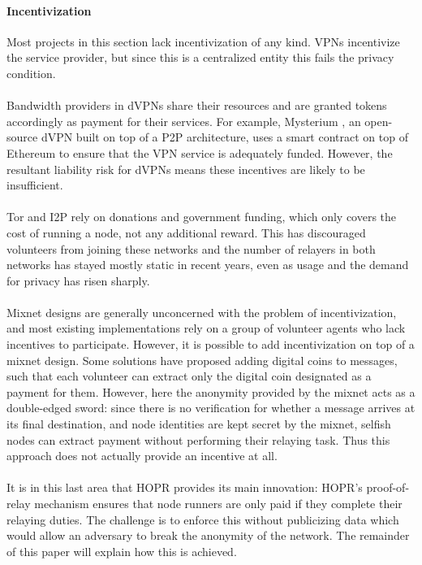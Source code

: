 \paragraph{Incentivization} Most projects in this section lack incentivization of any kind. VPNs incentivize the service provider, but since this is a centralized entity this fails the privacy condition. 
\\~\\Bandwidth providers in dVPNs share their resources and are granted tokens accordingly as payment for their
services. For example, Mysterium \cite{mysterium}, an open-source dVPN built on top of a P2P architecture, uses a smart contract on top of Ethereum to ensure
that the VPN service is adequately funded. However, the resultant liability risk for dVPNs means these incentives are likely to be insufficient. 
\\~\\Tor and I2P rely on donations and government funding, which only covers the cost of running a node, not any additional reward. This has discouraged volunteers from joining these networks and the number of relayers in both networks has stayed mostly static in recent years, even as usage and the demand for privacy has risen sharply.
\\~\\Mixnet designs are generally unconcerned with the problem of incentivization, and most existing implementations rely on a group of volunteer agents who lack incentives to participate. However, it is possible to add incentivization on top of a mixnet design. Some solutions have proposed adding digital coins to messages, such
that each volunteer can extract only the digital coin designated as a payment for them. However, here the anonymity provided by the mixnet acts as a double-edged sword: since there is no verification for whether a message arrives at its final destination, and node identities are kept secret by the mixnet, selfish nodes can extract payment without performing their relaying task. Thus this approach does not actually provide an incentive at all.
\\~\\It is in this last area that HOPR provides its main innovation: HOPR's proof-of-relay mechanism ensures that node runners are only paid if they complete their relaying duties. The challenge is to enforce this without publicizing data which would allow an adversary to break the anonymity of the network. The remainder of this paper will explain how this is achieved. 